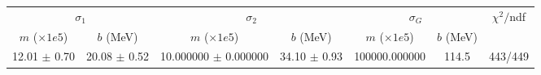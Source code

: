 \begin{tabular}{cc|cc|cc||c}
\multicolumn{2}{c|}{$\sigma_1$} & \multicolumn{2}{|c}{$\sigma_2$} & \multicolumn{2}{|c}{$\sigma_G$}  & \multirow{2}{*}{$\chi^2/$ndf}\\
$m$ ($\times1e5$) & $b$ (MeV) & $m$ ($\times1e5$) & $b$ (MeV) & $m$ ($\times1e5$) & $b$ (MeV) & \\
\hline
12.01 $\pm$ 0.70 & 20.08 $\pm$ 0.52 & 10.000000 $\pm$ 0.000000 & 34.10 $\pm$ 0.93 & 100000.000000 & 114.5 & 443/449\\
\end{tabular}
